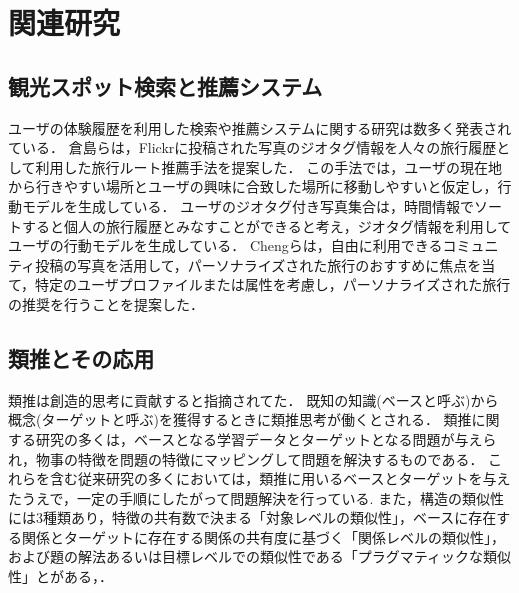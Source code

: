 \documentclass[submit,techrep,noauthor]{ipsj}
\begin{document}
\section{関連研究}
\subsection{観光スポット検索と推薦システム}
ユーザの体験履歴を利用した検索や推薦システムに関する研究は数多く発表されている．
倉島ら\cite{Codd01}は，Flickrに投稿された写真のジオタグ情報を人々の旅行履歴として利用した旅行ルート推薦手法を提案した．
この手法では，ユーザの現在地から行きやすい場所とユーザの興味に合致した場所に移動しやすいと仮定し，行動モデルを生成している．
ユーザのジオタグ付き写真集合は，時間情報でソートすると個人の旅行履歴とみなすことができると考え，ジオタグ情報を利用してユーザの行動モデルを生成している．
Chengらは\cite{Codd03}，自由に利用できるコミュニティ投稿の写真を活用して，パーソナライズされた旅行のおすすめに焦点を当て，特定のユーザプロファイルまたは属性を考慮し，パーソナライズされた旅行の推奨を行うことを提案した．

\subsection{類推とその応用}
類推は創造的思考に貢献すると指摘されてた\cite{Codd04}．
既知の知識(ベースと呼ぶ)から概念(ターゲットと呼ぶ)を獲得するときに類推思考が働くとされる\cite{Codd05}．
類推に関する研究の多くは，ベースとなる学習データとターゲットとなる問題が与えられ，物事の特徴を問題の特徴にマッピングして問題を解決するもの\cite{Codd06}である．
これらを含む従来研究の多くにおいては，類推に用いるベースとターゲットを与えたうえで，一定の手順にしたがって問題解決を行っている.
また，構造の類似性には3種類あり，特徴の共有数で決まる「対象レベルの類似性」，ベースに存在する関係とターゲットに存在する関係の共有度に基づく「関係レベルの類似性」，および題の解法あるいは目標レベルでの類似性である「プラグマティックな類似性」とがある\cite{Codd05}，\cite{Codd09}．
\end{document}
